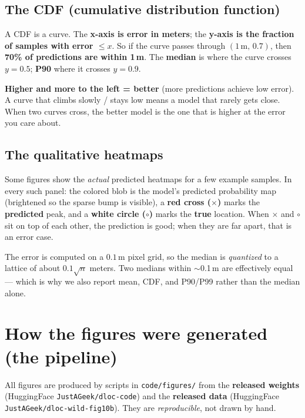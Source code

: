 \documentclass[11pt]{article}
\begin{document}
\subsection*{The CDF (cumulative distribution function)}
A CDF is a curve. The \textbf{x-axis is error in meters}; the \textbf{y-axis is the fraction of samples
with error $\le x$}. So if the curve passes through $(1\,\text{m},\,0.7)$, then \textbf{70\% of
predictions are within 1\,m}. The \textbf{median} is where the curve crosses $y = 0.5$; \textbf{P90}
where it crosses $y = 0.9$.

\begin{readbox}
\textbf{Higher and more to the left = better} (more predictions achieve low error). A curve that climbs
slowly / stays low means a model that rarely gets close. When two curves cross, the better model is the
one that is higher at the error you care about.
\end{readbox}

\subsection*{The qualitative heatmaps}
Some figures show the \emph{actual} predicted heatmaps for a few example samples. In every such panel:
the colored blob is the model's predicted probability map (brightened so the sparse bump is visible), a
\textbf{red cross ($\times$)} marks the \textbf{predicted} peak, and a \textbf{white circle ($\circ$)}
marks the \textbf{true} location. When $\times$ and $\circ$ sit on top of each other, the prediction is
good; when they are far apart, that is an error case.

\begin{measurebox}
The error is computed on a $0.1$\,m pixel grid, so the median is \emph{quantized} to a lattice of about
$0.1\sqrt{n}$ meters. Two medians within $\sim$0.1\,m are effectively equal --- which is why we also
report mean, CDF, and P90/P99 rather than the median alone.
\end{measurebox}

\section{How the figures were generated (the pipeline)}

All figures are produced by scripts in \texttt{code/figures/} from the \textbf{released weights}
(HuggingFace \texttt{JustAGeek/dloc-code}) and the \textbf{released data} (HuggingFace
\texttt{JustAGeek/dloc-wild-fig10b}). They are \emph{reproducible}, not drawn by hand.
\end{document}
